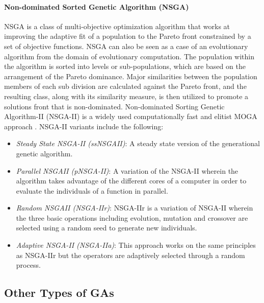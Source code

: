 \documentclass[journal]{IEEEtran}
\begin{document}
\vspace{2mm}
\paragraph{Non-dominated Sorted Genetic Algorithm (NSGA)}

NSGA is a class of multi-objective optimization algorithm that works at improving the adaptive fit of a population to the Pareto front constrained by a set of objective functions. NSGA can also be seen as a case of an evolutionary algorithm from the domain of evolutionary computation. The population within the algorithm is sorted into levels or sub-populations, which are based on the arrangement of the Pareto dominance. Major similarities between the population members of each sub division are calculated against the Pareto front, and the resulting class, along with its similarity measure, is then utilized to promote a solutions front that is non-dominated. Non-dominated Sorting Genetic Algorithm-II (NSGA-II) is a widely used computationally fast and elitist MOGA approach 
\cite{deb2002fast}. NSGA-II variants include the following:

\begin{itemize}

\vspace{1mm}
\item \emph{Steady State NSGA-II (ssNSGAII)}: A steady state version of the generational genetic algorithm. 

\item \emph{Parallel NSGAII (pNSGA-II)}: A variation of the NSGA-II wherein the algorithm takes advantage of the different cores of a computer in order to evaluate the individuals of a function in parallel. 

\item \emph{Random NSGAII (NSGA-IIr)}: NSGA-IIr is a variation of NSGA-II wherein the three basic operations including evolution, mutation and crossover are selected using a random seed to generate new individuals. 

\item\emph{Adaptive NSGA-II (NSGA-IIa)}: This approach works on the same principles as NSGA-IIr but the operators are adaptively selected through a random process.

\end{itemize}



\subsection{Other Types of GAs}
\end{document}
